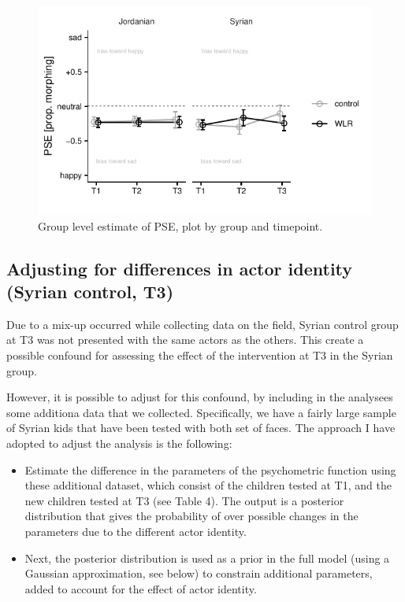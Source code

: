 \documentclass[]{article}
\begin{document}
\begin{figure}[H]

{\centering \includegraphics{WLR-analyses-report_files/figure-latex/unnamed-chunk-4-1} 

}

\caption{Group level estimate of PSE, plot by group and timepoint.}\label{fig:unnamed-chunk-4}
\end{figure}

\hypertarget{adjusting-for-differences-in-actor-identity-syrian-control-t3}{%
\subsection{Adjusting for differences in actor identity (Syrian control,
T3)}\label{adjusting-for-differences-in-actor-identity-syrian-control-t3}}

Due to a mix-up occurred while collecting data on the field, Syrian
control group at T3 was not presented with the same actors as the
others. This create a possible confound for assessing the effect of the
intervention at T3 in the Syrian group.

However, it is possible to adjust for this confound, by including in the
analysees some additiona data that we collected. Specifically, we have a
fairly large sample of Syrian kids that have been tested with both set
of faces. The approach I have adopted to adjust the analysis is the
following:

\begin{itemize}
\item
  Estimate the difference in the parameters of the psychometric function
  using these additional dataset, which consist of the children tested
  at T1, and the new children tested at T3 (see Table 4). The output is
  a posterior distribution that gives the probability of over possible
  changes in the parameters due to the different actor identity.
\item
  Next, the posterior distribution is used as a prior in the full model
  (using a Gaussian approximation, see below) to constrain additional
  parameters, added to account for the effect of actor identity.
\end{itemize}
\end{document}
